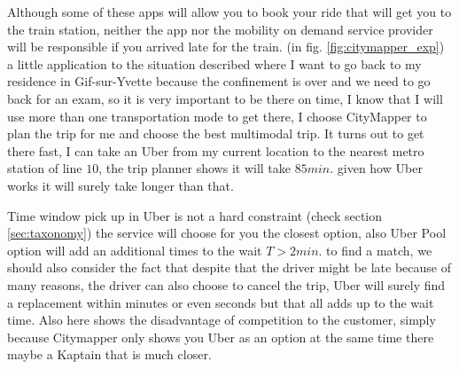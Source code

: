\documentclass{article}
\begin{document}
Although some of these apps will allow you to book your ride that will get you to the train station, neither the app nor the mobility on demand service provider will be responsible if you arrived late for the train. (in fig. \ref{fig:citymapper_exp}) a little application to the situation described where I want to go back to my residence in Gif-sur-Yvette because the confinement is over and we need to go back for an exam, so it is very important to be there on time, I know that I will use more than one transportation mode to get there, I choose CityMapper to plan the trip for me and choose the best multimodal trip. It turns out to get there fast, I can take an Uber from my current location to the nearest metro station of line $10$, the trip planner shows it will take $85 min.$ given how Uber works it will surely take longer than that.


Time window pick up in Uber is not a hard constraint (check section \ref{sec:taxonomy}) the service will choose for you the closest option, also Uber Pool option will add an additional times to the wait $T > 2min.$ to find a match, we should also consider the fact that despite that the driver might be late because of many reasons, the driver can also choose to cancel the trip, Uber will surely find a replacement within minutes or even seconds but that all adds up to the wait time. 
Also here shows the disadvantage of competition to the customer, simply because Citymapper only shows you Uber as an option at the same time there maybe a Kaptain that is much closer.
\end{document}
